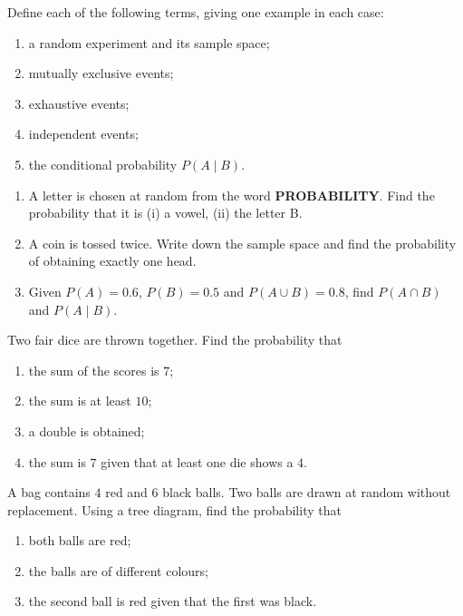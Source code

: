 \documentclass[11pt]{article}
\newcounter{popsec}
\newcounter{popsub}
\newcommand{\courssub}[1]{%
  \stepcounter{popsub}%
  \par\vspace{9pt}\noindent{\popxbold\fontsize{11.5}{13}\selectfont\color{popink}{\color{poporange}\thepopsec.\thepopsub}\hspace{6pt}#1}\par\nopagebreak\vspace{4pt}
}
\begin{document}
\begin{exercice}[Definitions]
Define each of the following terms, giving one example in each case:
\begin{enumerate}
\item a random experiment and its sample space;
\item mutually exclusive events;
\item exhaustive events;
\item independent events;
\item the conditional probability $P(A\mid B)$.
\end{enumerate}
\end{exercice}

\begin{exercice}
\begin{enumerate}
\item A letter is chosen at random from the word \textbf{PROBABILITY}. Find the probability that it is (i) a vowel, (ii) the letter B.
\item A coin is tossed twice. Write down the sample space and find the probability of obtaining exactly one head.
\item Given $P(A)=0.6$, $P(B)=0.5$ and $P(A\cup B)=0.8$, find $P(A\cap B)$ and $P(A\mid B)$.
\end{enumerate}
\end{exercice}

\courssub{I practise}

\begin{exercice}
Two fair dice are thrown together. Find the probability that
\begin{enumerate}
\item the sum of the scores is $7$;
\item the sum is at least $10$;
\item a double is obtained;
\item the sum is $7$ given that at least one die shows a $4$.
\end{enumerate}
\end{exercice}

\begin{exercice}
A bag contains $4$ red and $6$ black balls. Two balls are drawn at random without replacement. Using a tree diagram, find the probability that
\begin{enumerate}
\item both balls are red;
\item the balls are of different colours;
\item the second ball is red given that the first was black.
\end{enumerate}
\end{exercice}
\end{document}

